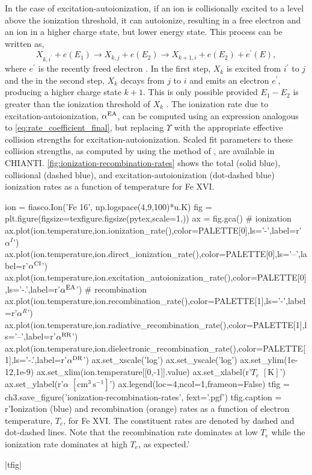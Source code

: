 In the case of excitation-autoionization, if an ion is collisionally excited to a level above the ionization threshold, it can autoionize, resulting in a free electron and an ion in a higher charge state, but lower energy state. This process can be written as,
\begin{equation}\label{eq:excitation_autoionization}
    X_{k,i^\prime} + e(E_1) \to X_{k,j} + e(E_2) \to X_{k+1,i} + e(E_2) + e^\prime(E),
\end{equation}
where $e^\prime$ is the recently freed electron \citep{phillips_ultraviolet_2008}. In the first step, $X_k$ is excited from $i^\prime$ to $j$ and the in the second step, $X_k$ decays from $j$ to $i$ and emits an electron $e^\prime$, producing a higher charge state $k+1$. This is only possible provided $E_1 - E_2$ is greater than the ionization threshold of $X_k$ \citep{bradshaw_collisional_2013}. The ionization rate due to excitation-autoionization, $\alpha^\textup{EA}$, can be computed using an expression analogous to \autoref{eq:rate_coefficient_final}, but replacing $\Upsilon$ with the appropriate effective collision strengths for excitation-autoionization. Scaled fit parameters to these collision strengths, as computed by \citet{dere_ionization_2007} using the method of \citet{burgess_analysis_1992}, are available in CHIANTI. \autoref{fig:ionization-recombination-rates} shows the total (solid blue), collisional (dashed blue), and excitation-autoionization (dot-dashed blue) ionization rates as a function of temperature for Fe XVI.   

\begin{pycode}[chapter3]
ion = fiasco.Ion('Fe 16', np.logspace(4,9,100)*u.K)
fig = plt.figure(figsize=texfigure.figsize(pytex,scale=1,))
ax = fig.gca()
# ionization
ax.plot(ion.temperature,ion.ionization_rate(),color=PALETTE[0],ls='-',label=r'$\alpha^I$')
ax.plot(ion.temperature,ion.direct_ionization_rate(),color=PALETTE[0],ls='--',label=r'$\alpha^\textup{CI}$')
ax.plot(ion.temperature,ion.excitation_autoionization_rate(),color=PALETTE[0],ls='-.',label=r'$\alpha^\textup{EA}$')
# recombination
ax.plot(ion.temperature,ion.recombination_rate(),color=PALETTE[1],ls='-',label=r'$\alpha^R$')
ax.plot(ion.temperature,ion.radiative_recombination_rate(),color=PALETTE[1],ls='--',label=r'$\alpha^\textup{RR}$')
ax.plot(ion.temperature,ion.dielectronic_recombination_rate(),color=PALETTE[1],ls='-.',label=r'$\alpha^\textup{DR}$')
ax.set_xscale('log')
ax.set_yscale('log')
ax.set_ylim(1e-12,1e-9)
ax.set_xlim(ion.temperature[[0,-1]].value)
ax.set_xlabel(r'$T_e$ $[\si{\kelvin}]$')
ax.set_ylabel(r'$\alpha$ $[\si{\cm}^3\,\si{\second}^{-1}]$')
ax.legend(loc=4,ncol=1,frameon=False)
tfig = ch3.save_figure('ionization-recombination-rates', fext='.pgf')
tfig.caption = r'Ionization (blue) and recombination (orange) rates as a function of electron temperature, $T_e$, for Fe XVI. The constituent rates are denoted by dashed and dot-dashed lines. Note that the recombination rate dominates at low $T_e$ while the ionization rate dominates at high $T_e$, as expected.'
\end{pycode}
\py[chapter3]|tfig|

